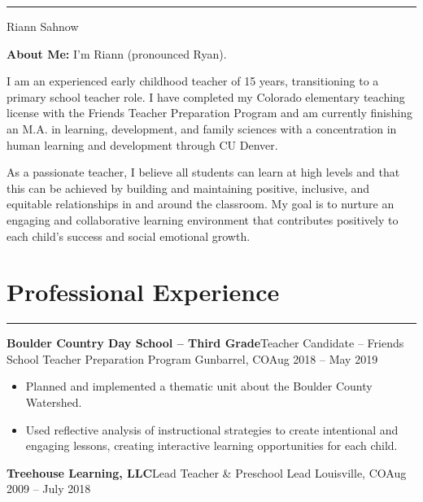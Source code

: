 \documentclass[letterpaper,10pt]{article}
\newcommand{\mblue}{\color{darkblue}}
\begin{document}
\pagestyle{empty}

{\mblue\rule{4.63in}{0.08cm}}

\vspace{-1.0pc}
\hfill{\Huge\mblue Riann Sahnow}

\vspace{2pc}

\textbf{About Me:} I'm Riann (pronounced Ryan).

\vspace{1pc}\qquad\qquad I am an experienced early childhood teacher of 15 years, transitioning to a primary school teacher role. I have completed my Colorado elementary teaching license
with the Friends Teacher Preparation Program and am currently finishing an M.A. in learning, development, and family sciences with a concentration in human learning and development through CU Denver.

\vspace{1pc}\qquad\qquad As a passionate teacher, I believe all students can learn at high levels and that this can be achieved by building and maintaining positive, inclusive, and
equitable relationships in and around the classroom. My goal is to nurture an engaging and collaborative learning environment that contributes positively to each child's success and
social emotional growth.

\section*{\mblue Professional Experience}

\vspace{-2.15pc}
{\hfill\mblue\rule{4.615in}{0.02cm}}

\vspace{1pc}
\textbf{Boulder Country Day School -- Third Grade}\hfill Teacher Candidate -- Friends School Teacher Preparation Program
\smallbreak Gunbarrel, CO\hfill Aug 2018 -- May 2019

\begin{itemize}
    \item Planned and implemented a thematic unit about the Boulder County Watershed.
    \item Used reflective analysis of instructional strategies to create intentional and engaging lessons, creating interactive learning opportunities for each child.
\end{itemize}


\vspace{1pc}
\textbf{Treehouse Learning, LLC}\hfill Lead Teacher \& Preschool Lead
\smallbreak Louisville, CO\hfill Aug 2009 -- July 2018
\end{document}
